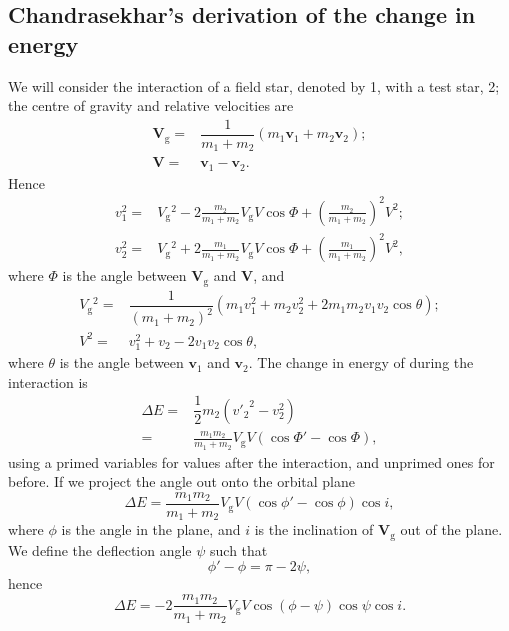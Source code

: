 \documentclass[useAMS,usedcolumn,usegraphicx,usenatbib]{mn2e}
\newcommand{\sub}[1]{\ensuremath{_\mathrm{#1}}}
\newcommand{\recip}[1]{\ensuremath{\dfrac{1}{#1}}}
\begin{document}
\begin{onecolumn}
\subsection{Chandrasekhar's derivation of the change in energy}

We will consider the interaction of a field star, denoted by 1, with a test star, 2; the centre of gravity and relative velocities are
\begin{subequations}
\begin{align}
\boldsymbol{V}\sub{g} =  {} & \recip{m_1 + m_2}\left(m_1 \boldsymbol{v}_1 + m_2 \boldsymbol{v}_2\right);\\
\boldsymbol{V} =  {} & \boldsymbol{v}_1 - \boldsymbol{v}_2.
\end{align}
\label{eq:Vs}
\end{subequations}
Hence
\begin{subequations}
\begin{align}
v_1^2 = {} & V\sub{g}^2 - 2\frac{m_2}{m_1 + m_2}V\sub{g}V \cos\Phi + \left(\frac{m_2}{m_1 + m_2}\right)^2V^2;\\
v_2^2 = {} & V\sub{g}^2 + 2\frac{m_1}{m_1 + m_2}V\sub{g}V \cos\Phi + \left(\frac{m_1}{m_1 + m_2}\right)^2V^2,
\end{align}
\end{subequations}
where $\Phi$ is the angle between $\boldsymbol{V}\sub{g}$ and $\boldsymbol{V}$, and
\begin{subequations}
\begin{align}
V\sub{g}^2 = {} & \recip{(m_1 + m_2)^2}\left(m_1v_1^2 + m_2v_2^2 + 2 m_1 m_2 v_1 v_2 \cos\theta\right);\\
V^2 = {} & v_1^2 + v_2 - 2 v_1 v_2 \cos\theta,
\end{align}
\label{eq:V2s}
\end{subequations}
where $\theta$ is the angle between $\boldsymbol{v}_1$ and $\boldsymbol{v}_2$. The change in energy of during the interaction is
\begin{align}
\Delta E = {} & \recip{2} m_2 \left({v'_2}^2 - v_2^2\right)\\
 = {} & \frac{m_1 m_2}{m_1 + m_2}V\sub{g}V\left(\cos\Phi' - \cos\Phi\right),
\end{align}
using a primed variables for values after the interaction, and unprimed ones for before. If we project the angle out onto the orbital plane
\begin{equation}
\Delta E = \frac{m_1 m_2}{m_1 + m_2}V\sub{g}V\left(\cos\phi' - \cos\phi\right)\cos i,
\end{equation}
where $\phi$ is the angle in the plane, and $i$ is the inclination of $\boldsymbol{V}\sub{g}$ out of the plane. We define the deflection angle $\psi$ such that
\begin{equation}
\phi' - \phi = \pi - 2\psi,
\end{equation}
hence
\begin{equation}
\Delta E = -2\frac{m_1 m_2}{m_1 + m_2}V\sub{g}V\cos(\phi - \psi)\cos\psi\cos i.
\end{equation}


\end{onecolumn}
\end{document}
